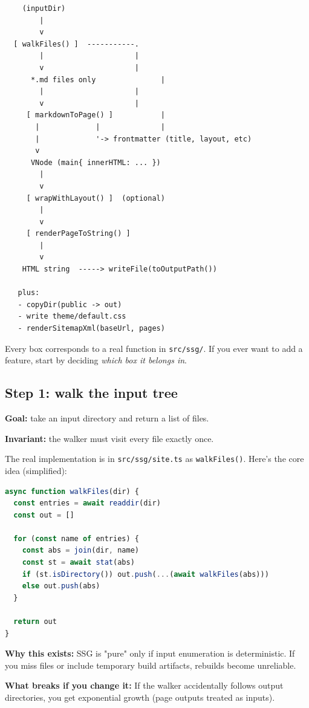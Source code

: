 \begin{verbatim}
    (inputDir)
        |
        v
  [ walkFiles() ]  -----------.
        |                     |
        v                     |
      *.md files only               |
        |                     |
        v                     |
     [ markdownToPage() ]           |
       |             |              |
       |             '-> frontmatter (title, layout, etc)
       v
      VNode (main{ innerHTML: ... })
        |
        v
     [ wrapWithLayout() ]  (optional)
        |
        v
     [ renderPageToString() ]
        |
        v
    HTML string  -----> writeFile(toOutputPath())

   plus:
   - copyDir(public -> out)
   - write theme/default.css
   - renderSitemapXml(baseUrl, pages)
\end{verbatim}

Every box corresponds to a real function in \texttt{src/ssg/}.
If you ever want to add a feature, start by deciding \emph{which box it belongs in}.

\subsection{Step 1: walk the input tree}
\textbf{Goal:} take an input directory and return a list of files.

\textbf{Invariant:} the walker must visit every file exactly once.

The real implementation is in \texttt{src/ssg/site.ts} as \texttt{walkFiles()}.
Here's the core idea (simplified):

\begin{lstlisting}[style=relax,language=JavaScript,caption={Walking the input directory (simplified).}]
async function walkFiles(dir) {
  const entries = await readdir(dir)
  const out = []

  for (const name of entries) {
    const abs = join(dir, name)
    const st = await stat(abs)
    if (st.isDirectory()) out.push(...(await walkFiles(abs)))
    else out.push(abs)
  }

  return out
}
\end{lstlisting}

\textbf{Why this exists:}
SSG is "pure" only if input enumeration is deterministic.
If you miss files or include temporary build artifacts, rebuilds become unreliable.

\textbf{What breaks if you change it:}
If the walker accidentally follows output directories, you get exponential growth (page outputs treated as inputs).

